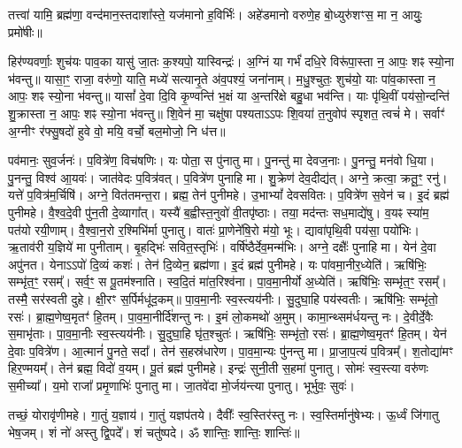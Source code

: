 तत्त्वा॑ यामि॒ ब्रह्म॑णा॒ वन्द॑मान॒स्तदाशा᳚स्ते॒ यज॑मानो ह॒विर्भिः॑। 
अहे॑डमानो वरुणे॒ह बो॒ध्युरु॑शꣳस॒ मा न॒ आयुः॒ प्रमो॑षीः॥

हिर॑ण्यवर्णाः॒ शुच॑यः पाव॒का यासु॑ जा॒तः क॒श्यपो॒ यास्विन्द्रः॑।
अ॒ग्निं या गर्भं॑ दधि॒रे विरू॑पा॒स्ता न॒ आपः॒ शꣴ स्यो॒ना भ॑वन्तु॥ 
यासा॒ꣳ॒ राजा॒ वरु॑णो॒ याति॒ मध्ये॑ सत्यानृ॒ते अ॑व॒पश्यं॒ जना॑नाम्।
म॒धु॒श्चुतः॒ शुच॑यो॒ याः पा॑व॒कास्ता न॒ आपः॒ शꣴ स्यो॒ना भ॑वन्तु॥ 
यासां᳚ दे॒वा दि॒वि कृ॒ण्वन्ति॑ भ॒क्षं या अ॒न्तरि॑क्षे बहु॒धा भव॑न्ति।
याः पृ॑थि॒वीं पय॑सो॒न्दन्ति॑ शु॒क्रास्ता न॒ आपः॒ शꣴ स्यो॒ना भ॑वन्तु॥ 
शि॒वेन॑ मा॒ चक्षु॑षा पश्यताऽऽपः शि॒वया॑ त॒नुवोप॑ स्पृशत॒ त्वचं॑ मे।
सर्वाꣳ॑ अ॒ग्नीꣳ र॑फ्सु॒षदो॑ हुवे वो॒ मयि॒ वर्चो॒ बल॒मोजो॒ नि ध॑त्त॥

पव॑मानः॒ सुव॒र्जनः॑। प॒वित्रे॑ण॒ विच॑\ur{}षणिः। यः पोता॒ स पु॑नातु मा। पु॒नन्तु॑ मा देवज॒नाः।
पु॒नन्तु॒ मन॑वो धि॒या। पु॒नन्तु॒ विश्व॑ आ॒यवः॑। जात॑वेदः प॒वित्र॑वत्। प॒वित्रे॑ण पुनाहि मा।
शु॒क्रेण॑ देव॒दीद्य॑त्। अग्ने॒ क्रत्वा॒ क्रतू॒ꣳ॒ रनु॑। यत्ते॑ प॒वित्र॑म॒र्चिषि॑। अग्ने॒ वित॑तमन्त॒रा।
ब्रह्म॒ तेन॑ पुनीमहे। उ॒भाभ्यां᳚ देवसवितः। प॒वित्रे॑ण स॒वेन॑ च। इ॒दं ब्रह्म॑ पुनीमहे।
वै॒श्व॒दे॒वी पु॑न॒ती दे॒व्यागा᳚त्। यस्यै॑ ब॒ह्वीस्त॒नुवो॑ वी॒तपृ॑ष्ठाः।
तया॒ मद॑न्तः सध॒माद्ये॑षु। व॒यꣴ स्या॑म॒ पत॑यो रयी॒णाम्।
वै॒श्वा॒न॒रो र॒श्मिभि॑र्मा पुनातु। वातः॑ प्रा॒णेने॑षि॒रो म॑यो॒ भूः।
द्यावा॑पृथि॒वी पय॑सा॒ पयो॑भिः। ऋ॒ताव॑री य॒ज्ञिये॑ मा पुनीताम्।
बृ॒हद्भिः॑ सवित॒स्तृभिः॑। वर्{}षि॑ष्ठैर्देव॒मन्म॑भिः।
अग्ने॒ दक्षैः᳚ पुनाहि मा। येन॑ दे॒वा अपु॑नत।
येनाऽऽपो॑ दि॒व्यं कशः॑। तेन॑ दि॒व्येन॒ ब्रह्म॑णा। इ॒दं ब्रह्म॑ पुनीमहे। यः पा॑वमा॒नीर॒ध्येति॑।
ऋषि॑भिः॒ सम्भृ॑त॒ꣳ॒ रसम्᳚। सर्व॒ꣳ॒ स पू॒तम॑श्नाति।
स्व॒दि॒तं मा॑त॒रिश्व॑ना। पा॒व॒मा॒नीर्यो अ॒ध्येति॑।
ऋषि॑भिः॒ सम्भृ॑त॒ꣳ॒ रसम्᳚। तस्मै॒ सर॑स्वती दुहे। क्षी॒रꣳ स॒र्पिर्मधू॑द॒कम्॥
पा॒व॒मा॒नीः स्व॒स्त्यय॑नीः। सु॒दुघा॒हि पय॑स्वतीः।
ऋषि॑भिः॒ सम्भृ॑तो॒ रसः॑। ब्रा॒ह्म॒णेष्व॒मृतꣳ॑ हि॒तम्।
पा॒व॒मा॒नीर्दि॑शन्तु नः। इ॒मं लो॒कमथो॑ अ॒मुम्।
कामा॒न्थ्सम॑र्धयन्तु नः। दे॒वीर्दे॒वैः स॒माभृ॑ताः।
पा॒व॒मा॒नीः स्व॒स्त्यय॑नीः। सु॒दुघा॒हि घृ॑त॒श्चुतः॑।
ऋषि॑भिः॒ सम्भृ॑तो॒ रसः॑। ब्रा॒ह्म॒णेष्व॒मृतꣳ॑ हि॒तम्।
येन॑ दे॒वाः प॒वित्रे॑ण। आ॒त्मानं॑ पु॒नते॒ सदा᳚।
तेन॑ स॒हस्र॑धारेण। पा॒व॒मा॒न्यः पु॑नन्तु मा।
प्रा॒जा॒प॒त्यं प॒वित्रम्᳚। श॒तोद्या॑मꣳ हिर॒ण्मयम्᳚।
तेन॑ ब्रह्म॒ विदो॑ व॒यम्। पू॒तं ब्रह्म॑ पुनीमहे।
इन्द्रः॑ सुनी॒ती स॒हमा॑ पुनातु। सोमः॑ स्व॒स्त्या वरु॑णः स॒मीच्या᳚।
य॒मो राजा᳚ प्रमृ॒णाभिः॑ पुनातु मा। जा॒तवे॑दा मो॒र्जय॑न्त्या पुनातु। भूर्भुवः॒ सुवः॑।

तच्छं॒ योरावृ॑णीमहे। गा॒तुं य॒ज्ञाय॑।
गा॒तुं यज्ञप॑तये। दैवीः᳚ स्व॒स्तिर॑स्तु नः।
स्व॒स्तिर्मानु॑षेभ्यः। ऊ॒र्ध्वं जि॑गातु भेष॒जम्।
शं नो॑ अस्तु द्वि॒पदे᳚। शं चतु॑ष्पदे।
ॐ शान्तिः॒ शान्तिः॒ शान्तिः॑॥

